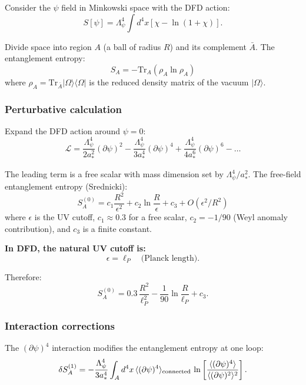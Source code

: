 \documentclass[11pt,a4paper]{article}
\begin{document}
Consider the $\psi$ field in Minkowski space with the DFD action:
\begin{equation}
S[\psi] = \Lambda_\psi^4\int d^4x\left[\chi - \ln(1+\chi)\right].
\end{equation}

Divide space into region $A$ (a ball of radius $R$) and its complement $\bar A$. The entanglement entropy:
\begin{equation}
S_A = -\text{Tr}_A(\rho_A\ln\rho_A)
\end{equation}
where $\rho_A = \text{Tr}_{\bar A}|\Omega\rangle\langle\Omega|$ is the reduced density matrix of the vacuum $|\Omega\rangle$.

\subsubsection{Perturbative calculation}

Expand the DFD action around $\psi = 0$:
\begin{equation}
\mathcal{L} = \frac{\Lambda_\psi^4}{2a_*^2}(\partial\psi)^2 - \frac{\Lambda_\psi^4}{3a_*^4}(\partial\psi)^4 + \frac{\Lambda_\psi^4}{4a_*^6}(\partial\psi)^6 - \ldots
\end{equation}

The leading term is a free scalar with mass dimension set by $\Lambda_\psi^4/a_*^2$. The free-field entanglement entropy (Srednicki):
\begin{equation}\label{eq:S-free}
S_A^{(0)} = c_1\frac{R^2}{\epsilon^2} + c_2\ln\frac{R}{\epsilon} + c_3 + O(\epsilon^2/R^2)
\end{equation}
where $\epsilon$ is the UV cutoff, $c_1 \approx 0.3$ for a free scalar, $c_2 = -1/90$ (Weyl anomaly contribution), and $c_3$ is a finite constant.

\textbf{In DFD, the natural UV cutoff is:}
\begin{equation}
\epsilon = \ell_P \quad \text{(Planck length)}.
\end{equation}

Therefore:
\begin{equation}
S_A^{(0)} = 0.3\,\frac{R^2}{\ell_P^2} - \frac{1}{90}\ln\frac{R}{\ell_P} + c_3.
\end{equation}

\subsubsection{Interaction corrections}

The $(\partial\psi)^4$ interaction modifies the entanglement entropy at one loop:
\begin{equation}
\delta S_A^{(1)} = -\frac{\Lambda_\psi^4}{3a_*^4}\int_A d^4x\,\langle(\partial\psi)^4\rangle_{\rm connected}\,\ln\left[\frac{\langle(\partial\psi)^4\rangle}{\langle(\partial\psi)^2\rangle^2}\right].
\end{equation}
\end{document}
